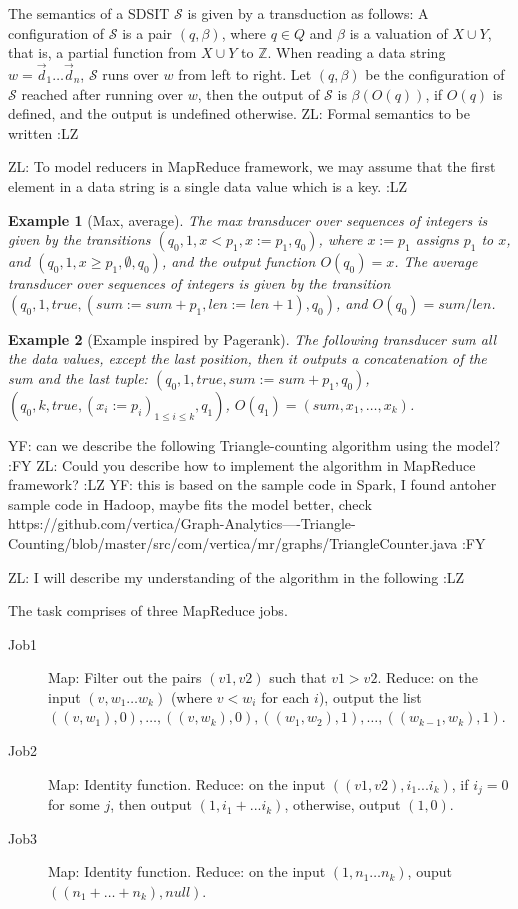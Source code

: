 \documentclass[11pt]{article}
\newtheorem{example}{Example}
\def\Ss{{\mathcal{S} }}
\def\Ii{{\mathbb{Z} }}
\newcommand{\yfc}[1]{\color{blue} {YF: #1 :FY} \color{black}}
\newcommand{\zhilin}[1]{\color{cyan} {ZL: #1 :LZ} \color{black}}
\begin{document}
The semantics of a SDSIT $\Ss$  is given by a transduction as follows: A configuration of $\Ss$ is a pair $(q,\beta)$, where $q \in Q$ and $\beta$ is a valuation of $X \cup Y$, that is, a partial function from $X \cup Y$ to $\Ii$. When reading a data string $w=\vec{d}_1 \dots \vec{d}_n$, $\Ss$ runs over $w$ from left to right. Let $(q, \beta)$ be the configuration of $\Ss$ reached after running over $w$, then the output of $\Ss$ is $\beta(O(q))$, if $O(q)$ is defined, and the output is undefined otherwise. \zhilin{Formal semantics to be written}

\zhilin{To model reducers in MapReduce framework, we may assume that the first element in a data string is a single data value which is a key.}

\begin{example}[Max, average]
The max transducer over sequences of integers is given by the transitions $(q_0, 1, x < p_1, x:=p_1, q_0)$, where $x:= p_1$ assigns $p_1$ to $x$, and $(q_0, 1, x \ge p_1 , \emptyset, q_0)$, and the output function $O(q_0)=x$. The average transducer over sequences of integers is given by the transition $(q_0, 1, true, (sum:=sum + p_1, len := len +1), q_0)$, and $O(q_0)=sum / len$. 
\end{example}

\begin{example}[Example inspired by Pagerank]
The following transducer sum all the data values, except the last position, then it outputs a concatenation of the sum and the last tuple: $(q_0, 1, true, sum:= sum + p_1, q_0)$, $(q_0, k, true, (x_i:=p_i)_{1 \le i \le k}, q_1)$, $O(q_1)=(sum, x_1,\dots, x_k)$.
\end{example}

\yfc{can we describe the following Triangle-counting algorithm using the model?}
\zhilin{Could you describe how to implement the algorithm in MapReduce framework?}
\yfc{this is based on the sample code in Spark, I found antoher sample code in Hadoop, maybe fits the model better, check https://github.com/vertica/Graph-Analytics----Triangle-Counting/blob/master/src/com/vertica/mr/graphs/TriangleCounter.java}

\zhilin{I will describe my understanding of the algorithm in the following} 

The task comprises of three MapReduce jobs. 
\begin{description}
\item[Job1] Map: Filter out the pairs $(v1,v2)$ such that $v1 > v2$. Reduce: on the input $(v, w_1 \dots w_k)$ (where $v < w_i$ for each $i$), output the list $((v,w_1),0), \dots, ((v,w_k),0), ((w_1,w_2),1), \dots, ((w_{k-1},w_k),1)$.
\item[Job2] Map: Identity function. Reduce: on the input $((v1,v2),i_1 ... i_k)$, if $i_j=0$ for some $j$, then output $(1, i_1+...i_k)$, otherwise, output $(1,0)$.
\item[Job3] Map: Identity function. Reduce: on the input $(1,n_1 \dots n_k)$, ouput $((n_1+\dots + n_k),null)$.
\end{description}
\end{document}
